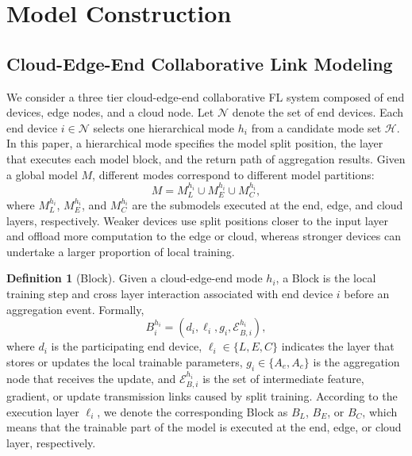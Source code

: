 ﻿\documentclass[preprint,12pt]{elsarticle}
\theoremstyle{plain}
\theoremstyle{definition}
\newtheorem{definition}[theorem]{Definition}
\theoremstyle{remark}
\begin{document}
\section{Model Construction}
\label{sec:model}
\subsection{Cloud-Edge-End Collaborative Link Modeling}
\label{sec:link_model}
We consider a three tier cloud-edge-end collaborative FL system composed of end devices, edge nodes, and a cloud node.
Let \(\mathcal{N}\) denote the set of end devices.
Each end device \(i\in\mathcal{N}\) selects one hierarchical mode \(h_i\) from a candidate mode set \(\mathcal{H}\).
In this paper, a hierarchical mode specifies the model split position, the layer that executes each model block, and the return path of aggregation results.
Given a global model \(M\), different modes correspond to different model partitions:
\begin{equation}
    M = M_L^{h_i} \cup M_E^{h_i} \cup M_C^{h_i},
\end{equation}
where \(M_L^{h_i}\), \(M_E^{h_i}\), and \(M_C^{h_i}\) are the submodels executed at the end, edge, and cloud layers, respectively.
Weaker devices use split positions closer to the input layer and offload more computation to the edge or cloud, whereas stronger devices can undertake a larger proportion of local training.

\begin{definition}[Block]
Given a cloud-edge-end mode \(h_i\), a Block is the local training step and cross layer interaction associated with end device \(i\) before an aggregation event.
Formally,
\begin{equation}
    B_i^{h_i}=(d_i,\ell_i,g_i,\mathcal{E}_{B,i}^{h_i}),
\end{equation}
where \(d_i\) is the participating end device, \(\ell_i\in\{L,E,C\}\) indicates the layer that stores or updates the local trainable parameters, \(g_i\in\{A_e,A_c\}\) is the aggregation node that receives the update, and \(\mathcal{E}_{B,i}^{h_i}\) is the set of intermediate feature, gradient, or update transmission links caused by split training.
According to the execution layer \(\ell_i\), we denote the corresponding Block as \(B_L\), \(B_E\), or \(B_C\), which means that the trainable part of the model is executed at the end, edge, or cloud layer, respectively.
\end{definition}
\end{document}
